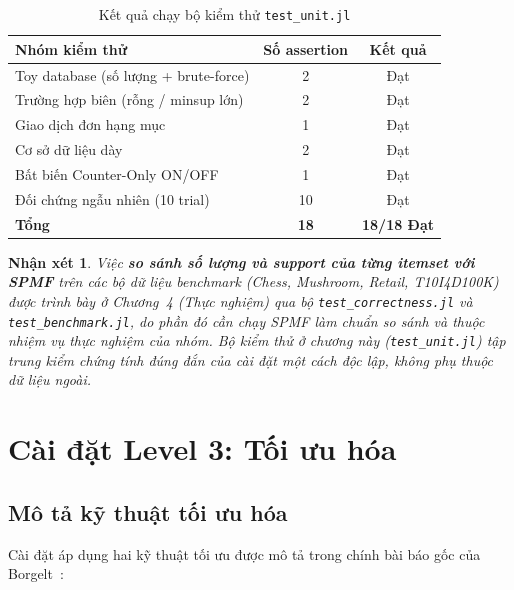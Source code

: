 \documentclass[12pt,a4paper]{report}
\newtheorem{remark}{Nhận xét}[chapter]
\begin{document}
\begin{table}[H]
    \centering
    \caption{Kết quả chạy bộ kiểm thử \texttt{test\_unit.jl}}
    \label{tab:unittest}
    \begin{tabularx}{\textwidth}{|X|c|c|}
        \hline
        \textbf{Nhóm kiểm thử} & \textbf{Số assertion} & \textbf{Kết quả} \\
        \hline
        Toy database (số lượng + brute-force)   & 2  & Đạt \\
        \hline
        Trường hợp biên (rỗng / minsup lớn)     & 2  & Đạt \\
        \hline
        Giao dịch đơn hạng mục                  & 1  & Đạt \\
        \hline
        Cơ sở dữ liệu dày                       & 2  & Đạt \\
        \hline
        Bất biến Counter-Only ON/OFF            & 1  & Đạt \\
        \hline
        Đối chứng ngẫu nhiên (10 trial)         & 10 & Đạt \\
        \hline
        \textbf{Tổng}                           & \textbf{18} & \textbf{18/18 Đạt} \\
        \hline
    \end{tabularx}
\end{table}

\begin{remark}
Việc \textbf{so sánh số lượng và support của từng itemset với SPMF} trên các bộ
dữ liệu benchmark (Chess, Mushroom, Retail, T10I4D100K) được trình bày ở
Chương~4 (Thực nghiệm) qua bộ \texttt{test\_correctness.jl} và
\texttt{test\_benchmark.jl}, do phần đó cần chạy SPMF làm chuẩn so sánh và thuộc
nhiệm vụ thực nghiệm của nhóm. Bộ kiểm thử ở chương này
(\texttt{test\_unit.jl}) tập trung kiểm chứng tính đúng đắn của \emph{cài đặt}
một cách độc lập, không phụ thuộc dữ liệu ngoài.
\end{remark}


\section{Cài đặt Level 3: Tối ưu hóa}

\subsection{Mô tả kỹ thuật tối ưu hóa}

Cài đặt áp dụng hai kỹ thuật tối ưu được mô tả trong chính bài báo gốc
của Borgelt~\cite{borgelt2005}:
\end{document}
